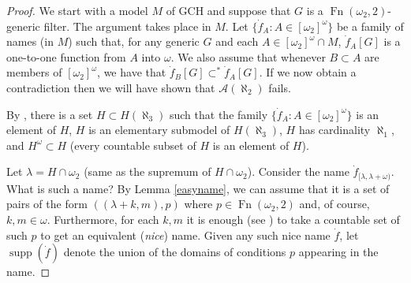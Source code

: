 \documentclass{amsart}
\theoremstyle{plain}
\theoremstyle{definition}
\theoremstyle{remark}
\theoremstyle{plain}
\theoremstyle{definition}
\theoremstyle{remark}
\begin{document}
            \begin{proof}
            We start with a model $M$ of GCH and suppose that $G$ is a
            $\operatorname{Fn}(\omega_2,2)$-generic filter. The argument takes
            place in $M$.
            Let $\{ \dot f_{A} : A\in [\omega_2]^\omega\}$ be a family of
            names (in $M$)
             such that, for any generic $G$ and each $A\in [\omega_2]^\omega\cap
             M$,
             $\dot f_{A}[G]$ is a one-to-one function from $A$ into
            $\omega$.  We also assume that whenever $B\subset A$ are members of
            $[\omega_2]^\omega$, we have that $\dot f_{B}[G]\subset^* \dot
            f_{A}[G]$. If we now obtain a contradiction
            then we will have shown that $\mathcal A(\aleph_2)$ fails.

            By \cite[1.5]{MR1031969}, there is a set $H\subset H(\aleph_3)$
            such that the family $\{ \dot f_{A} : A\in [\omega_2]^{\omega}\}$ is an
            element of $H$,  $H$ is an elementary submodel of
            $ H(\aleph_3)$, $H$ has cardinality
            $\aleph_1$, and $H^\omega\subset H$ (every
             countable subset of $H$ is an element of $H$).



            Let $\lambda = H\cap \omega_2$ (same as the supremum of $H\cap
            \omega_2$). Consider the name  $\dot f_{[\lambda,\lambda+\omega)}$.
            What is such a name?  By Lemma \ref{easyname},
            we can assume that it is a set of pairs
             of the form $( (\lambda+k,m), p)$ where $p\in \mathop{Fn}(\omega_2,
             2)$ and, of course, $k,m\in \omega$.
            Furthermore,  for each $k,m$ it is enough
            (see \cite[5.11,5.12]{MR597342})
            to take a  countable set of such $p$ to get an equivalent
            (\textit{nice}\/) name.
            Given any such nice name $\dot f$, let $\operatorname{supp}(\dot f)$
            denote the union of the domains of conditions $p$ appearing in the
            name.


\end{proof}
\end{document}
